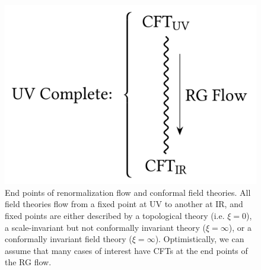 \documentclass[12pt]{article}
\numberwithin{equation}{section}
\begin{document}
\begin{figure}
	\centering
	\includegraphics[scale=.35]{flow}
	\caption[End points of renormalization flow and conformal field theories]{\label{fig: UV completion}End points of renormalization flow and conformal field theories. All field theories flow from a fixed point at UV to another at IR, and fixed points are either described by a topological theory (i.e. $\xi=0$), a scale-invariant but not conformally invariant theory ($\xi=\infty$), or a conformally invariant field theory ($\xi=\infty$). Optimistically, we can assume that many cases of interest have CFTs at the end points of the RG flow.}
\end{figure}
\end{document}
